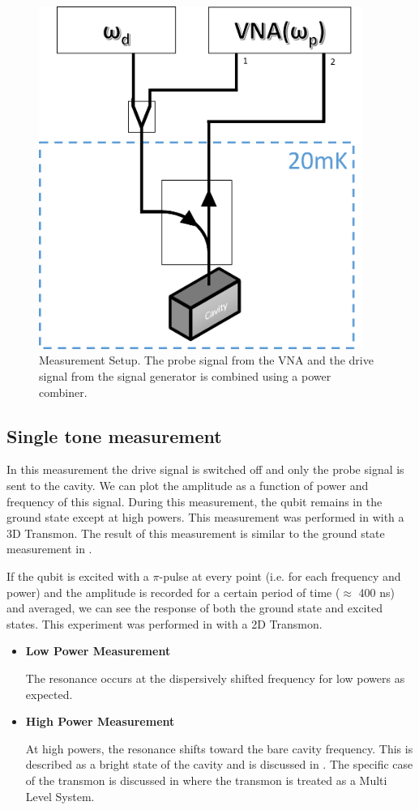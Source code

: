 \begin{figure}
\centering
\includegraphics[width=400px]{Figures/measurement_circuit.png}
\decoRule
\caption[Measurement Setup]{Measurement Setup. The probe signal from the VNA and the drive signal from the signal generator is combined using a power combiner.}
\label{fig:measurement setup}
\end{figure}

\subsection{Single tone measurement}

In this measurement the drive signal is switched off and only the probe signal is sent to the cavity. We can plot the amplitude as a function of power and frequency of this signal. During this measurement, the qubit remains in the ground state except at high powers. This measurement was performed in \cite{Paik2011} with a 3D Transmon. The result of this measurement is similar to the ground state measurement in \cite{Reed2010}.

If the qubit is excited with a $\pi$-pulse at every point (i.e. for each frequency and power) and the amplitude is recorded for a certain period of time ($\approx$ 400 ns) and averaged, we can see the response of both the ground state and excited states. This experiment was performed in \cite{Reed2010} with a 2D Transmon.

\begin{itemize}
\item \textbf{Low Power Measurement}

The resonance occurs at the dispersively shifted frequency for low powers as expected.

\item \textbf{High Power Measurement}

At high powers, the resonance shifts toward the bare cavity frequency. This is described as a bright state of the cavity and is discussed in \cite{Bishop2010}. The specific case of the transmon is discussed in \cite{Boissonneault2010} where the transmon is treated as a Multi Level System.
\end{itemize}



